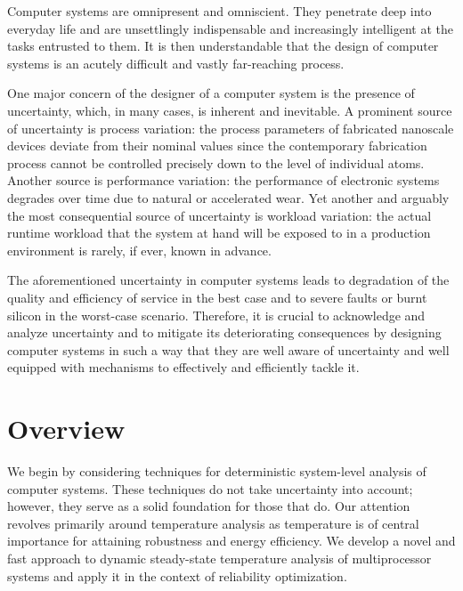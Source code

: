 Computer systems are omnipresent and omniscient. They penetrate deep into
everyday life and are unsettlingly indispensable and increasingly intelligent at
the tasks entrusted to them. It is then understandable that the design of
computer systems is an acutely difficult and vastly far-reaching process.

One major concern of the designer of a computer system is the presence of
uncertainty, which, in many cases, is inherent and inevitable. A prominent
source of uncertainty is process variation: the process parameters of fabricated
nanoscale devices deviate from their nominal values since the contemporary
fabrication process cannot be controlled precisely down to the level of
individual atoms. Another source is performance variation: the performance of
electronic systems degrades over time due to natural or accelerated wear. Yet
another and arguably the most consequential source of uncertainty is workload
variation: the actual runtime workload that the system at hand will be exposed
to in a production environment is rarely, if ever, known in advance.

The aforementioned uncertainty in computer systems leads to degradation of the
quality and efficiency of service in the best case and to severe faults or burnt
silicon in the worst-case scenario. Therefore, it is crucial to acknowledge and
analyze uncertainty and to mitigate its deteriorating consequences by designing
computer systems in such a way that they are well aware of uncertainty and well
equipped with mechanisms to effectively and efficiently tackle it.

\section{Overview}

We begin by considering techniques for deterministic system-level analysis of
computer systems. These techniques do not take uncertainty into account;
however, they serve as a solid foundation for those that do. Our attention
revolves primarily around temperature analysis as temperature is of central
importance for attaining robustness and energy efficiency. We develop a novel
and fast approach to dynamic steady-state temperature analysis of multiprocessor
systems and apply it in the context of reliability optimization.

